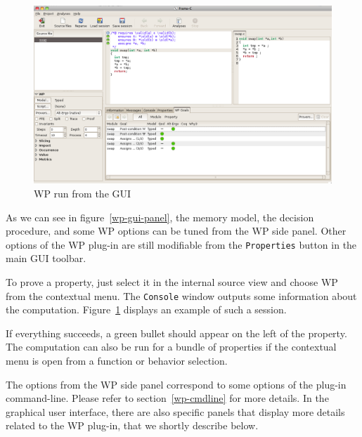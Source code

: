 \begin{figure}[p]
\begin{center}
\includegraphics[width=\textwidth]{wp-gui-run.png}
\end{center}
\caption{\textsf{WP} run from the GUI}
\label{wp-gui-run}
\end{figure}

As we can see in figure~\ref{wp-gui-panel}, the memory model, the
decision procedure, and some \textsf{WP} options can be tuned from the
\textsf{WP} side panel. Other options of the \textsf{WP} plug-in are still
modifiable from the \texttt{Properties} button in the main GUI toolbar.

To prove a property, just select it in the internal source view and
choose \textsf{WP} from the contextual menu. The \texttt{Console}
window outputs some information about the
computation. Figure~\ref{wp-gui-run} displays an example of such a
session.

If everything succeeds, a green bullet should appear on the left of
the property. The computation can also be run for a bundle of
properties if the contextual menu is open from a function or behavior
selection.

The options from the \textsf{WP} side panel correspond to some options
of the plug-in command-line. Please refer to section~\ref{wp-cmdline}
for more details. In the graphical user interface, there are also
specific panels that display more details related to the \textsf{WP} plug-in,
that we shortly describe below.


